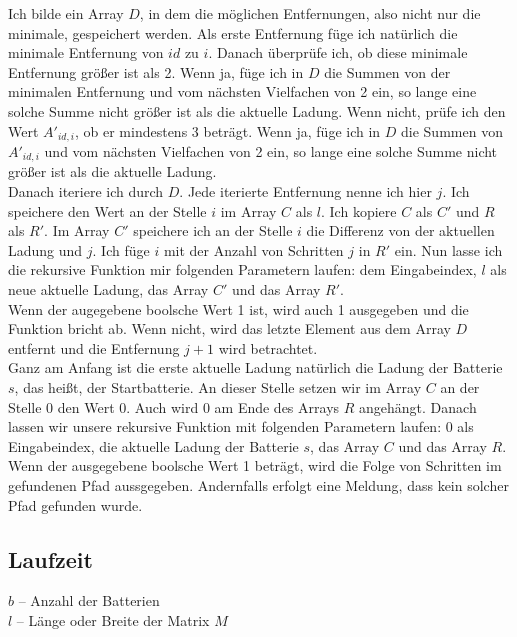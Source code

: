 \documentclass[a4paper,10pt,ngerman]{scrartcl}
\begin{document}
Ich bilde ein Array $D$, in dem die möglichen Entfernungen, also nicht nur die minimale, gespeichert werden. Als erste Entfernung
füge ich natürlich die minimale Entfernung von $id$ zu $i$. Danach überprüfe ich, ob diese minimale Entfernung größer ist als 2.
Wenn ja, füge ich in $D$ die Summen von der minimalen Entfernung und vom nächsten Vielfachen von 2 ein, so lange eine solche Summe nicht
größer ist als die aktuelle Ladung. Wenn nicht, prüfe ich den Wert $A'_{id, i}$, ob er mindestens 3 beträgt.
Wenn ja, füge ich in $D$ die Summen von $A'_{id, i}$ und vom nächsten Vielfachen von 2 ein, so lange eine solche Summe nicht
größer ist als die aktuelle Ladung.\\
Danach iteriere ich durch $D$. Jede iterierte Entfernung nenne ich hier $j$. Ich speichere den Wert an der Stelle $i$ im Array $C$ als $l$.
Ich kopiere $C$ als $C'$ und $R$ als $R'$. Im Array $C'$ speichere ich an der Stelle $i$ die Differenz von der aktuellen Ladung und $j$.
Ich füge $i$ mit der Anzahl von Schritten $j$ in $R'$ ein. Nun lasse ich die rekursive Funktion mir folgenden Parametern laufen:
dem Eingabeindex, $l$ als neue aktuelle Ladung, das Array $C'$ und das Array $R'$.\\
Wenn der augegebene boolsche Wert 1 ist, wird auch 1 ausgegeben und die Funktion bricht ab. Wenn nicht, wird das letzte Element
aus dem Array $D$ entfernt und die Entfernung $j+1$ wird betrachtet.\\

Ganz am Anfang ist die erste aktuelle Ladung natürlich die Ladung der Batterie $s$, das heißt, der Startbatterie. An dieser Stelle
setzen wir im Array $C$ an der Stelle $0$ den Wert 0. Auch wird 0 am Ende des Arrays $R$ angehängt.
Danach lassen wir unsere rekursive Funktion mit folgenden Parametern laufen: 0 als Eingabeindex, die aktuelle Ladung der Batterie $s$, 
das Array $C$ und das Array $R$.
Wenn der ausgegebene boolsche Wert 1 beträgt, wird die Folge von Schritten im gefundenen Pfad aussgegeben. Andernfalls erfolgt
eine Meldung, dass kein solcher Pfad gefunden wurde.

\newpage
\subsection{Laufzeit}\label{sec:time}

$b$ -- Anzahl der Batterien\\
$l$ -- Länge oder Breite der Matrix $M$\\
\end{document}
